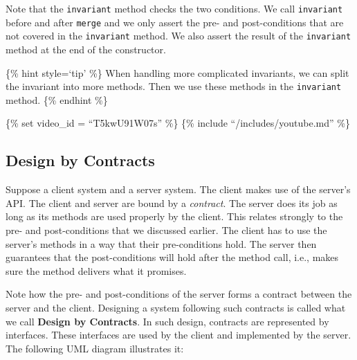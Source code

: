 Note that the \texttt{invariant} method checks the two conditions. We
call \texttt{invariant} before and after \texttt{merge} and we only
assert the pre- and post-conditions that are not covered in the
\texttt{invariant} method. We also assert the result of the
\texttt{invariant} method at the end of the constructor.

\{\% hint style=`tip' \%\} When handling more complicated invariants, we
can split the invariant into more methods. Then we use these methods in
the \texttt{invariant} method. \{\% endhint \%\}

\{\% set video\_id = ``T5kwU91W07s'' \%\} \{\% include
``/includes/youtube.md'' \%\}

\hypertarget{design-by-contracts-1}{%
\subsection{Design by Contracts}\label{design-by-contracts-1}}

Suppose a client system and a server system. The client makes use of the
server's API. The client and server are bound by a \emph{contract}. The
server does its job as long as its methods are used properly by the
client. This relates strongly to the pre- and post-conditions that we
discussed earlier. The client has to use the server's methods in a way
that their pre-conditions hold. The server then guarantees that the
post-conditions will hold after the method call, i.e., makes sure the
method delivers what it promises.

Note how the pre- and post-conditions of the server forms a contract
between the server and the client. Designing a system following such
contracts is called what we call \textbf{Design by Contracts}. In such
design, contracts are represented by interfaces. These interfaces are
used by the client and implemented by the server. The following UML
diagram illustrates it:

